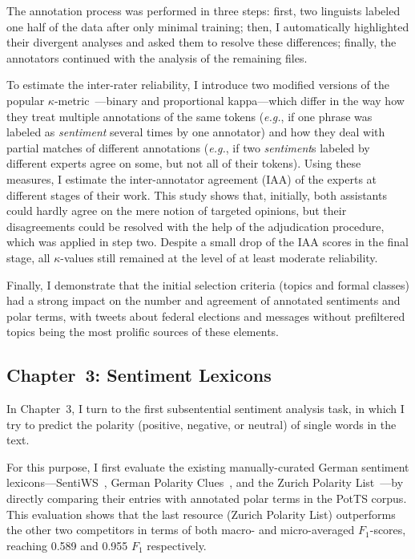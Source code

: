 \documentclass[11pt]{article}
\newcommand{\eg}{\textit{e.g.},}
\newcommand{\F}[0]{$F_1$}
\renewcommand{\cite}{\citep}
\begin{document}
The annotation process was performed in three steps: first, two
linguists labeled one half of the data after only minimal training;
then, I automatically highlighted their divergent analyses and asked
them to resolve these differences; finally, the annotators continued
with the analysis of the remaining files.

To estimate the inter-rater reliability, I introduce two modified
versions of the popular $\kappa$-metric~\cite{Cohen:60}---binary and
proportional kappa---which differ in the way how they treat multiple
annotations of the same tokens (\eg{} if one phrase was labeled as
\emph{sentiment} several times by one annotator) and how they deal
with partial matches of different annotations (\eg{} if two
\emph{sentiment}s labeled by different experts agree on some, but not
all of their tokens).  Using these measures, I estimate the
inter-annotator agreement (IAA) of the experts at different stages of
their work.  This study shows that, initially, both assistants could
hardly agree on the mere notion of targeted opinions, but their
disagreements could be resolved with the help of the adjudication
procedure, which was applied in step two.  Despite a small drop of the
IAA scores in the final stage, all $\kappa$-values still remained at
the level of at least moderate reliability.

Finally, I demonstrate that the initial selection criteria (topics and
formal classes) had a strong impact on the number and agreement of
annotated sentiments and polar terms, with tweets about federal
elections and messages without prefiltered topics being the most
prolific sources of these elements.

\subsection{Chapter~3: Sentiment Lexicons}

In Chapter~3, I turn to the first subsentential sentiment analysis
task, in which I try to predict the polarity (positive, negative, or
neutral) of single words in the text.

For this purpose, I first evaluate the existing manually-curated
German sentiment lexicons---SentiWS~\cite{Remus:10}, German Polarity
Clues~\cite{Waltinger:10}, and the Zurich Polarity
List~\cite{Clematide:10}---by directly comparing their entries with
annotated polar terms in the PotTS corpus.  This evaluation shows that
the last resource (Zurich Polarity List) outperforms the other two
competitors in terms of both macro- and micro-averaged \F{}-scores,
reaching 0.589 and 0.955 \F{} respectively.
\end{document}
